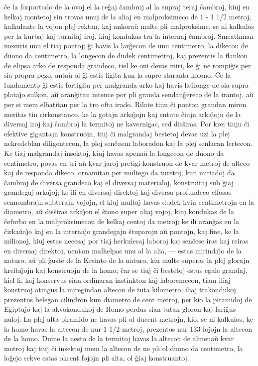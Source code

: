 \^ce la forportado de la ovoj el la re\^gaj \^cambroj al la supraj
teraj \^cambroj, kiuj en kelkaj montetoj sin trovas unuj de la aliaj
en malproksimeco de 1 - 1 1/2 metroj, kalkulante la vojon plej
rektan, kaj ankora\u u multe pli malproksime, se ni kalkulos per la
kurbaj kaj turnitaj iroj, kiuj kondukas tra la internaj \^cambroj.
Smeathman mezuris unu el tiaj pontoj; \^gi havis la lar\^gecon de
unu centimetro, la dikecon de duono da centimetro, la longecon de
dudek centimetroj, kaj prezentis la flankon de elipsa arko de
responda grandeco, tiel ke oni devas miri, ke \^gi ne rompi\^gis per
sia propra pezo, anta\u u ol \^gi estis ligita kun la supre staranta
kolono. \^Ce la fundamento \^gi estis fortigita per malgranda arko
kaj havis la\u ulonge de sia supra plata\^{\j}o sulkon, a\u u
aran\^gitan intence por pli granda sendan\^gereco de la irantoj, a\u
u per si mem elbatitan per la tro ofta irado. Rilate tiun \^ci
ponton grandan miron meritas tiu cirkonstanco, ke la gotajn
arka\^{\j}ojn kaj entute \^ciujn arka\^{\j}ojn de la diversaj iroj
kaj \^cambroj la termitoj ne kavernigas, sed dis\^siras. Por krei
tiujn \^ci efektive gigantajn konstruojn, tiuj \^ci malgrandaj
bestetoj devas uzi la plej nekredeblan diligentecon, la plej
sen\^cesan laboradon kaj la plej senlacan lertecon. Ke tiaj
malgrandaj insektoj, kiuj havas apena\u u la longecon de duono da
centimetro, povas en tri a\u u kvar jaroj pretigi konstruon de kvar
metroj de alteco kaj de responda dikeco, ornamitan per multego da
turetoj, kun miriadoj da \^cambroj de diversa grandeco kaj el
diversaj materialoj, konstruitaj sub \^giaj grandegaj arka\^{\j}oj;
ke ili en diversaj direktoj kaj diversa profundeco elfosas
sennombrajn subterajn vojojn, el kiuj multaj havas dudek kvin
centimetrojn en la diametro, a\u u dis\^siras arka\^{\j}on el
\^stono super aliaj vojoj, kiuj kondukas de la \^cefurbo en la
malproksimecon de kelkaj centoj da metroj; ke ili aran\^gas en la
\^cirka\u ua\^{\j}o kaj en la interna\^{\j}o grandegajn \^stuparojn
a\u u pontojn, kaj fine, ke la milionoj, kiuj estas necesaj por tiaj
herkulesaj laboroj kaj sen\^cese iras kaj reiras en diversaj
direktoj, neniam malhelpas unu al la alia, --- estas mirinda\^{\j}o
de la naturo, a\u u pli \^guste de la Kreinto de la naturo, kiu
multe superas la plej glorajn kreita\^{\j}ojn kaj konstruojn de la
homo; \^car se tiuj \^ci bestetoj estus egale grandaj, kiel li, kaj
konservus sian ordinaran instinkton kaj laboremecon, tiam iliaj
konstruoj atingus la miregindan altecon de tuta kilometro, iliaj
trakondukoj prezentus belegan cilindron kun diametro de cent metroj,
per kio la piramidoj de Egiptujo kaj la akvokondukoj de Romo perdus
sian tutan gloron kaj fari\^gus nuloj. La plej alta piramido ne
havas pli ol ducent metrojn, kio, se ni kalkulos, ke la homo havas
la altecon de nur 1 1/2 metroj, prezentos nur 133 fojojn la altecon
de la homo. Dume la nesto de la termitoj havas la altecon de
almena\u u kvar metroj kaj tiuj \^ci insektoj mem la altecon de ne
pli ol duono da centimetro, la lo\^gejo sekve estas okcent fojojn
pli alta, ol \^giaj konstruantoj.

\smallrule{}
